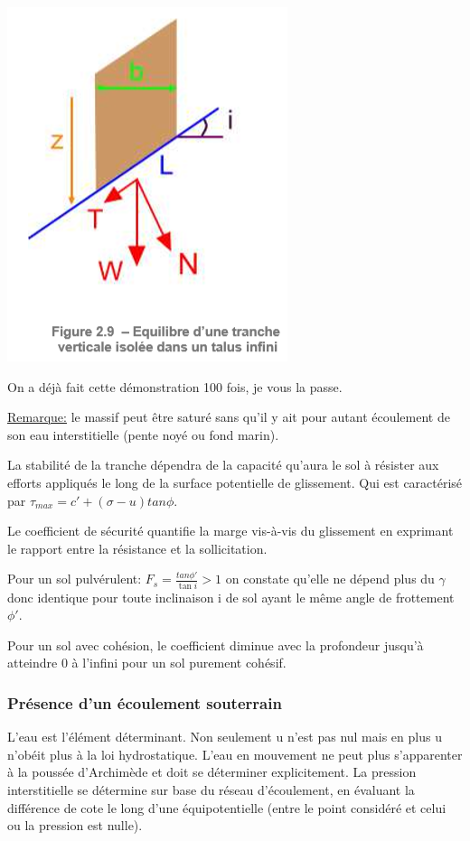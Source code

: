 \begin{center}
\includegraphics [scale=0.5]{pictures/ze.PNG}
\end{center}

On a déjà fait cette démonstration 100 fois, je vous la passe.

\underline{Remarque:} le massif peut être saturé sans qu'il y ait pour autant écoulement de son eau interstitielle (pente noyé ou fond marin).

La stabilité de la tranche dépendra de la capacité qu'aura le sol à résister aux efforts appliqués le long de la surface potentielle de glissement. Qui est caractérisé par $\tau_{max} = c' + (\sigma - u) tan \phi$.

Le coefficient de sécurité quantifie la marge vis-à-vis du glissement en exprimant le rapport entre la résistance et la sollicitation.

Pour un sol pulvérulent: $F_s = \frac{tan \phi'}{\tan i} > 1$ on constate qu'elle ne dépend plus du $\gamma$ donc identique pour toute inclinaison i de sol ayant le même angle de frottement $\phi'$.

Pour un sol avec cohésion, le coefficient diminue avec la profondeur jusqu'à atteindre 0 à l'infini pour un sol purement cohésif.

\subsubsection{Présence d'un écoulement souterrain}

L'eau est l'élément déterminant. Non seulement u n'est pas nul mais en plus u n'obéit plus à la loi hydrostatique. L'eau en mouvement ne peut plus s'apparenter à la poussée d'Archimède et doit se déterminer explicitement. La pression interstitielle se détermine sur base du réseau d'écoulement, en évaluant la différence de cote le long d'une équipotentielle (entre le point considéré et celui ou la pression est nulle).

